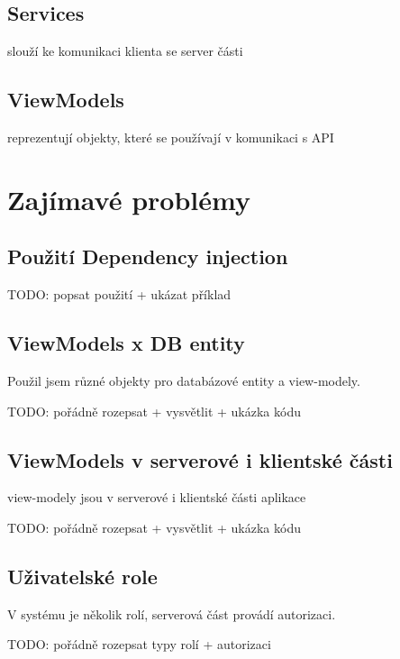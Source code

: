 \subsection{Services}

slouží ke komunikaci klienta se server části

\subsection{ViewModels}

reprezentují objekty, které se používají v komunikaci s API

\section{Zajímavé problémy}

\subsection{Použití Dependency injection}

TODO: popsat použití + ukázat příklad

\subsection{ViewModels x DB entity}

Použil jsem různé objekty pro databázové entity a view-modely.

TODO: pořádně rozepsat + vysvětlit + ukázka kódu

\subsection{ViewModels v serverové i klientské části}

view-modely jsou v serverové i klientské části aplikace

TODO: pořádně rozepsat + vysvětlit + ukázka kódu

\subsection{Uživatelské role}

V systému je několik rolí, serverová část provádí autorizaci.

TODO: pořádně rozepsat typy rolí + autorizaci
